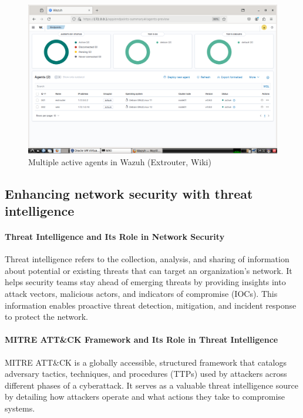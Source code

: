 \documentclass[12pt,a4paper]{report}
\begin{document}
\begin{figure}[H]
\centering
\includegraphics[width=\textwidth]{multiple active agents.png}
\caption{Multiple active agents in Wazuh (Extrouter, Wiki)}
\end{figure}

\subsection{Enhancing network security with threat intelligence}

\paragraph{Threat Intelligence and Its Role in Network Security}

Threat intelligence refers to the collection, analysis, and sharing of information about potential or existing threats that can target an organization’s network. It helps security teams stay ahead of emerging threats by providing insights into attack vectors, malicious actors, and indicators of compromise (IOCs). This information enables proactive threat detection, mitigation, and incident response to protect the network.

\paragraph{MITRE ATT\&CK Framework and Its Role in Threat Intelligence}

MITRE ATT\&CK is a globally accessible, structured framework that catalogs adversary tactics, techniques, and procedures (TTPs) used by attackers across different phases of a cyberattack. It serves as a valuable threat intelligence source by detailing how attackers operate and what actions they take to compromise systems.
\end{document}
